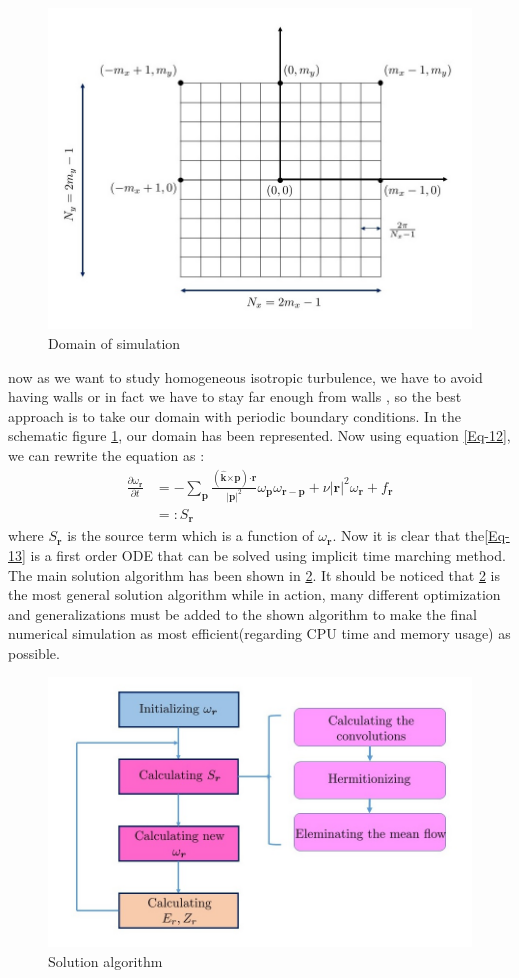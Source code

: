 \documentclass[10pt]{article}
\def\dotp{\bm{\cdot}}
\def\crossp{\bm{\times}}
\def\p{\bm{p}}
\def\r{\bm{r}}
\def\eK{\bm{\hat{k}}}
\begin{document}
%
\begin{figure}
\centering
\includegraphics{domain}
\caption{Domain of simulation}\label{Fig-1}
\end{figure}
%
now as we want to study homogeneous isotropic turbulence, we have to avoid having walls or in fact we have to stay far enough from walls , so the best approach is to take our domain with periodic boundary conditions. In the schematic figure \ref{Fig-1}, our domain has been represented. Now using equation \eqref{Eq-12}, we can rewrite the equation as :
%
\begin{align}
\frac{\partial\omega_{\r}}{\partial t} &= -\sum_{\p}{\frac{(\eK\crossp\p)\dotp\r}{|\p|^2}\omega_{\p}\omega_{\r-\p}}+\nu{|\r|}^2\omega_{\r} + f_{\r} \tag*{} \\
&=: S_{\r}\label{Eq-13}
\end{align}
%
where $S_{\r}$ is the source term which is a function of $\omega_{\r}$. Now it is clear that the\eqref{Eq-13} is a first order ODE that can be solved using implicit time marching method. The main solution algorithm has been shown in \ref{Fig-2}. It should be noticed that \ref{Fig-2} is the most general solution algorithm while in action, many different optimization and generalizations must be added to the shown algorithm to make the final numerical simulation as most efficient(regarding CPU time and memory usage) as possible.
%
\begin{figure}
\centering
\includegraphics[scale=0.5]{algorithm}
\caption{Solution algorithm}\label{Fig-2}
\end{figure}
%
\end{document}
